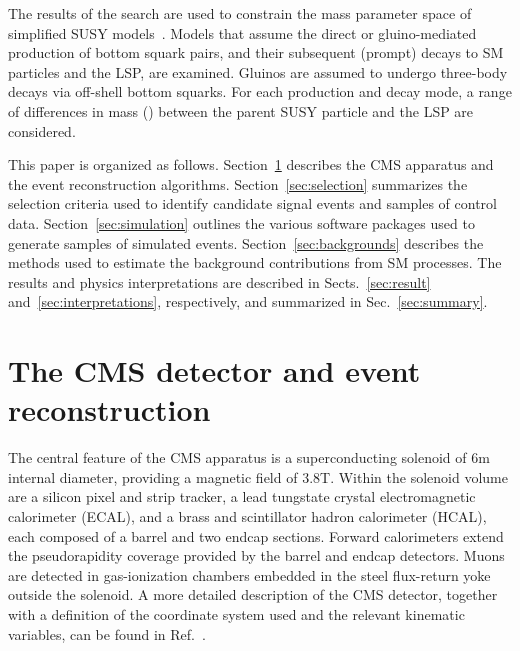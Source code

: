 The results of the search are used to constrain the mass parameter
space of simplified SUSY models~\cite{Alwall:2008ag, Alwall:2008va,
  sms}. Models that assume the direct or gluino-mediated production of
bottom squark pairs, and their subsequent (prompt) decays to SM
particles and the LSP, are examined. Gluinos are assumed to undergo
three-body decays via off-shell bottom squarks. For each production
and decay mode, a range of differences in mass (\dm) between the
parent SUSY particle and the LSP are considered. 

This paper is organized as follows. Section~\ref{sec:reconstruction}
describes the CMS apparatus and the event reconstruction
algorithms. Section~\ref{sec:selection} summarizes the selection
criteria used to identify candidate signal events and samples of
control data. Section~\ref{sec:simulation} outlines the various
software packages used to generate samples of simulated
events. Section~\ref{sec:backgrounds} describes the methods used to
estimate the background contributions from SM processes. The results
and physics interpretations are described in Sects.~\ref{sec:result}
and~\ref{sec:interpretations}, respectively, and summarized in
Sec.~\ref{sec:summary}.


\section{The CMS detector and event reconstruction}
\label{sec:reconstruction}

The central feature of the CMS apparatus is a superconducting solenoid
of 6\unit{m} internal diameter, providing a magnetic field of
3.8\unit{T}. Within the solenoid volume are a silicon pixel and strip
tracker, a lead tungstate crystal electromagnetic calorimeter (ECAL),
and a brass and scintillator hadron calorimeter (HCAL), each composed
of a barrel and two endcap sections. Forward calorimeters extend the
pseudorapidity coverage provided by the barrel and endcap
detectors. Muons are detected in gas-ionization chambers embedded in
the steel flux-return yoke outside the solenoid. A more detailed
description of the CMS detector, together with a definition of the
coordinate system used and the relevant kinematic variables, can be
found in Ref.~\cite{Chatrchyan:2008zzk}.

